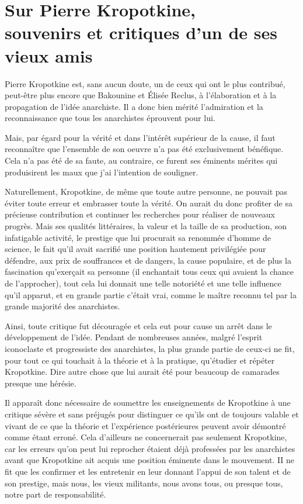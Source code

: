 \documentclass[french,twoside]{book} %
\begin{document}
  \chapter[{Sur Pierre Kropotkine, souvenirs et critiques d’un de ses vieux amis}]{Sur Pierre Kropotkine, \\
souvenirs et critiques d’un de ses vieux amis}
\noindent Pierre Kropotkine est, sans aucun doute, un de ceux qui ont le plus contribué, peut-être plus encore que Bakounine et Élisée Reclus, à l’élaboration et à la propagation de l’idée anarchiste. Il a donc bien mérité l’admiration et la reconnaissance que tous les anarchistes éprouvent pour lui.\par
Mais, par égard pour la vérité et dans l’intérêt supérieur de la cause, il faut reconnaître que l’ensemble de son oeuvre n’a pas été exclusivement bénéfique. Cela n’a pas été de sa faute, au contraire, ce furent ses éminents mérites qui produisirent les maux que j’ai l’intention de souligner.\par
Naturellement, Kropotkine, de même que toute autre personne, ne pouvait pas éviter toute erreur et embrasser toute la vérité. On aurait du donc profiter de sa précieuse contribution et continuer les recherches pour réaliser de nouveaux progrès. Mais ses qualités littéraires, la valeur et la taille de sa production, son infatigable activité, le prestige que lui procurait sa renommée d’homme de science, le fait qu’il avait sacrifié une position hautement privilégiée pour défendre, aux prix de souffrances et de dangers, la cause populaire, et de plus la fascination qu’exerçait sa personne (il enchantait tous ceux qui avaient la chance de l’approcher), tout cela lui donnait une telle notoriété et une telle influence qu’il apparut, et en grande partie c’était vrai, comme le maître reconnu tel par la grande majorité des anarchistes.\par
Ainsi, toute critique fut découragée et cela eut pour cause un arrêt dans le développement de l’idée. Pendant de nombreuses années, malgré l’esprit iconoclaste et progressiste des anarchistes, la plus grande partie de ceux-ci ne fit, pour tout ce qui touchait à la théorie et à la pratique, qu’étudier et répéter Kropotkine. Dire autre chose que lui aurait été pour beaucoup de camarades presque une hérésie.\par
Il apparaît donc nécessaire de soumettre les enseignements de Kropotkine à une critique sévère et sans préjugés pour distinguer ce qu’ils ont de toujours valable et vivant de ce que la théorie et l’expérience postérieures peuvent avoir démontré comme étant erroné. Cela d’ailleurs ne concernerait pas seulement Kropotkine, car les erreurs qu’on peut lui reprocher étaient déjà professées par les anarchistes avant que Kropotkine ait acquis une position éminente dans le mouvement. II ne fit que les confirmer et les entretenir en leur donnant l’appui de son talent et de son prestige, mais nous, les vieux militants, nous avons tous, ou presque tous, notre part de responsabilité.\par
\end{document}
